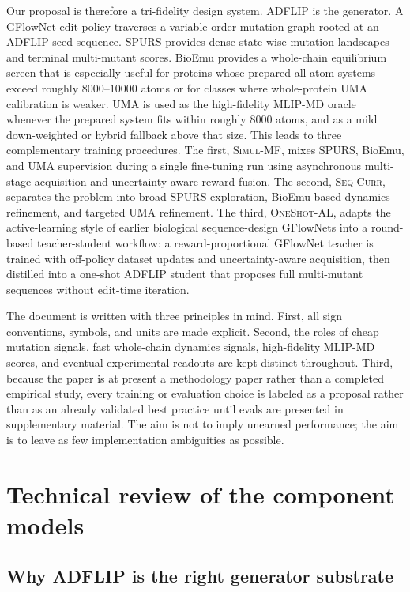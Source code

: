 \documentclass[11pt]{article}
\newcommand{\methodI}{\textsc{Simul-MF}}
\newcommand{\methodII}{\textsc{Seq-Curr}}
\newcommand{\methodIII}{\textsc{OneShot-AL}}
\begin{document}
Our proposal is therefore a tri-fidelity design system. ADFLIP is the generator. A GFlowNet edit policy traverses a variable-order mutation graph rooted at an ADFLIP seed sequence. SPURS provides dense state-wise mutation landscapes and terminal multi-mutant scores. BioEmu provides a whole-chain equilibrium screen that is especially useful for proteins whose prepared all-atom systems exceed roughly $8000$--$10000$ atoms or for classes where whole-protein UMA calibration is weaker. UMA is used as the high-fidelity MLIP-MD oracle whenever the prepared system fits within roughly $8000$ atoms, and as a mild down-weighted or hybrid fallback above that size. This leads to three complementary training procedures. The first, \methodI, mixes SPURS, BioEmu, and UMA supervision during a single fine-tuning run using asynchronous multi-stage acquisition and uncertainty-aware reward fusion. The second, \methodII, separates the problem into broad SPURS exploration, BioEmu-based dynamics refinement, and targeted UMA refinement. The third, \methodIII, adapts the active-learning style of earlier biological sequence-design GFlowNets \citep{jain2022bioseqgfn} into a round-based teacher-student workflow: a reward-proportional GFlowNet teacher is trained with off-policy dataset updates and uncertainty-aware acquisition, then distilled into a one-shot ADFLIP student that proposes full multi-mutant sequences without edit-time iteration.

The document is written with three principles in mind. First, all sign conventions, symbols, and units are made explicit. Second, the roles of cheap mutation signals, fast whole-chain dynamics signals, high-fidelity MLIP-MD scores, and eventual experimental readouts are kept distinct throughout. Third, because the paper is at present a methodology paper rather than a completed empirical study, every training or evaluation choice is labeled as a proposal rather than as an already validated best practice until evals are presented in supplementary material. The aim is not to imply unearned performance; the aim is to leave as few implementation ambiguities as possible.



\section{Technical review of the component models}

\subsection{Why ADFLIP is the right generator substrate}
\end{document}
